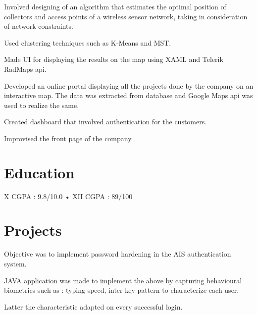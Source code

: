 \documentclass[]{deedy-resume-openfont}
\begin{document}
\begin{tightemize}
\item Involved designing of an algorithm that estimates the optimal position of collectors and access  points of a wireless sensor network, taking in consideration of network constraints.
\item Used clustering techniques such as K-Means and MST.
\item Made UI for displaying the results on the map using XAML and Telerik RadMaps api. 
\end{tightemize}
\sectionsep

\begin{tightemize}
\item Developed an online portal displaying all the projects done by the company on an interactive map. The data was extracted from database and Google Maps api was used to realize the same.
\item Created dashboard that involved authentication for the customers.
\item Improvised the front page of the company.
\end{tightemize}
\sectionsep


\section{Education}
\sectionsep

X CGPA : 9.8/10.0 • XII CGPA : 89/100
\sectionsep


\section{Projects}
\begin{tightemize}
\item Objective was to implement password hardening in the AIS authentication system.
\item JAVA application was made to implement the above by capturing behavioural biometrics such as : typing speed, inter key pattern to characterize each user.
\item Latter the characteristic adapted on every successful login.
\linebreak
\end{tightemize}
\sectionsep
\end{document}
